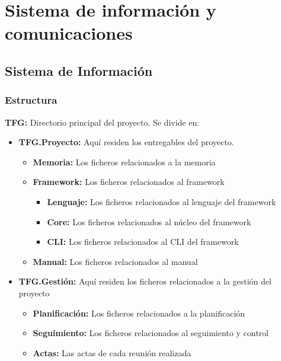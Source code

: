 \section{Sistema de información y comunicaciones}




\subsection{Sistema de Información}

\subsubsection{Estructura}


\textbf{TFG:} Directorio principal del proyecto. Se divide en:

\begin{itemize}
    \item \textbf{TFG.Proyecto:} Aquí residen los entregables del proyecto.
    \begin{itemize}
        \item \textbf{Memoria:} Los ficheros relacionados a la memoria
        \item \textbf{Framework:} Los ficheros relacionados al framework
        \begin{itemize}
            \item \textbf{Lenguaje:} Los ficheros relacionados al lenguaje del framework
            \item \textbf{Core:} Los ficheros relacionados al núcleo del framework
            \item \textbf{CLI:} Los ficheros relacionados al CLI del framework
        \end{itemize}
        \item \textbf{Manual:} Los ficheros relacionados al manual
    \end{itemize}
    \item \textbf{TFG.Gestión:} Aquí residen los ficheros relacionados a la gestión del proyecto
    \begin{itemize}
        \item \textbf{Planificación:} Los ficheros relacionados a la planificación
        \item \textbf{Seguimiento:} Los ficheros relacionados al seguimiento y control
        \item \textbf{Actas:} Las actas de cada reunión realizada
    \end{itemize}
\end{itemize}

